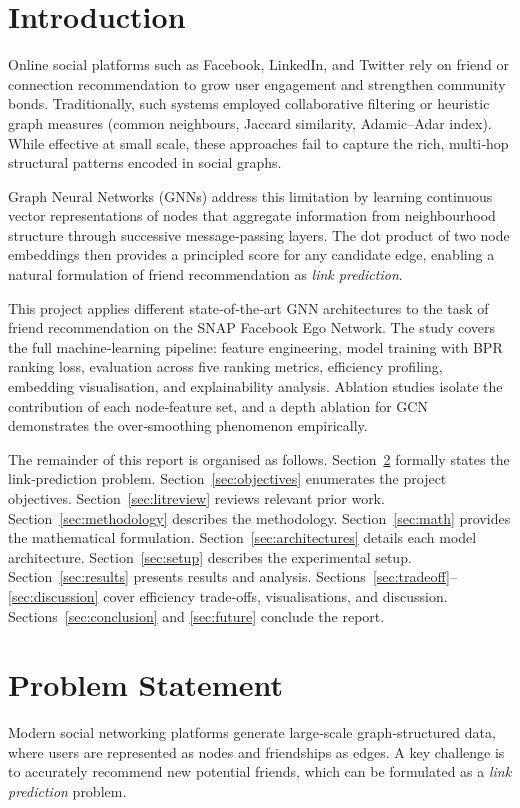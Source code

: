 \documentclass[conference]{IEEEtran}
\begin{document}
\section{Introduction}
Online social platforms such as Facebook, LinkedIn, and Twitter rely on friend or connection recommendation to grow user engagement and strengthen community bonds. Traditionally, such systems employed collaborative filtering or heuristic graph measures (common neighbours, Jaccard similarity, Adamic--Adar index). While effective at small scale, these approaches fail to capture the rich, multi‑hop structural patterns encoded in social graphs.

Graph Neural Networks (GNNs) address this limitation by learning continuous vector representations of nodes that aggregate information from neighbourhood structure through successive message‑passing layers. The dot product of two node embeddings then provides a principled score for any candidate edge, enabling a natural formulation of friend recommendation as \emph{link prediction}.

This project applies different state‑of‑the‑art GNN architectures to the task of friend recommendation on the SNAP Facebook Ego Network. The study covers the full machine‑learning pipeline: feature engineering, model training with BPR ranking loss, evaluation across five ranking metrics, efficiency profiling, embedding visualisation, and explainability analysis. Ablation studies isolate the contribution of each node‑feature set, and a depth ablation for GCN demonstrates the over‑smoothing phenomenon empirically.

The remainder of this report is organised as follows. Section~\ref{sec:problem} formally states the link‑prediction problem. Section~\ref{sec:objectives} enumerates the project objectives. Section~\ref{sec:litreview} reviews relevant prior work. Section~\ref{sec:methodology} describes the methodology. Section~\ref{sec:math} provides the mathematical formulation. Section~\ref{sec:architectures} details each model architecture. Section~\ref{sec:setup} describes the experimental setup. Section~\ref{sec:results} presents results and analysis. Sections~\ref{sec:tradeoff}--\ref{sec:discussion} cover efficiency trade‑offs, visualisations, and discussion. Sections~\ref{sec:conclusion} and \ref{sec:future} conclude the report.

\section{Problem Statement}\label{sec:problem}
Modern social networking platforms generate large‑scale graph‑structured data, where users are represented as nodes and friendships as edges. A key challenge is to accurately recommend new potential friends, which can be formulated as a \emph{link prediction} problem.
\end{document}
